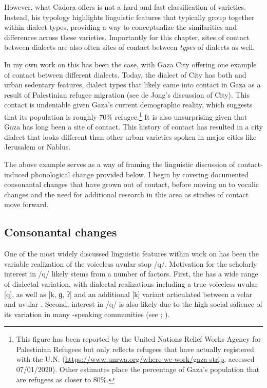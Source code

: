 \documentclass[output=paper]{langsci/langscibook}
\begin{document}
  However, what Cadora offers is not a hard and fast classification of  varieties. Instead, his typology highlights linguistic features that typically group together within dialect types, providing a way to conceptualize the similarities and differences across these varieties. Importantly for this chapter, sites of contact between  dialects are also often sites of contact between \textit{types} of dialects as well. 

  In my own work on   this has been the case, with Gaza City offering one example of contact between different   dialects. Today, the dialect of  City has both  and urban sedentary features, dialect types that likely came into contact in Gaza as a result of Palestinian refugee migration (see de Jong's \citeyear{DeJong2000} discussion of  City). This contact is undeniable given Gaza’s current demographic reality, which suggests that its population is roughly 70\% refugee.\footnote{This figure has been reported by the United Nations Relief Works Agency for Palestinian Refugees but only reflects refugees that have actually registered with the U.N. (\url{https://www.unrwa.org/where-we-work/gaza-strip}, accessed 07/01/2020). Other estimates place the percentage of Gaza’s population that are refugees as closer to 80\%.}  It is also unsurprising given that Gaza has long been a site of contact. This history of contact has resulted in a city dialect that looks different than other urban  varieties spoken in major cities like {Jerusalem} or Nablus. 

  The above example serves as a way of framing the linguistic discussion of contact-induced phonological change provided below. I begin by covering documented consonantal changes that have grown out of contact, before moving on to vocalic changes and the need for additional research in this area as studies of  contact move forward. 


 
 \subsection{Consonantal changes}


One of the most widely discussed linguistic features within work on   has been the variable realization of the voiceless uvular stop /q/. Motivation for the scholarly interest in /q/ likely stems from a number of factors. First, the  has a wide range of dialectal variation, with dialectal realizations including a true voiceless uvular [q], as well as [k, ɡ, ʔ] and an additional [k] variant articulated between a velar and uvular \citep{Shahin2011}. Second, interest in /q/ is also likely due to the high social salience of its variation in many -speaking communities (see \citealt{Hachimi2012}; \citealt{CotterHoresh2015}). 
\end{document}
